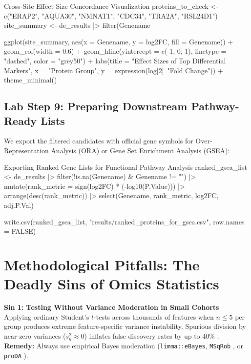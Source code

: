 \documentclass[11pt,twoside,openright]{book}
\begin{document}
\begin{rchunk}{Cross-Site Effect Size Concordance Visualization}
proteins_to_check <- c("ERAP2", "AQUA30", "NMNAT1", "CDC34", "TRA2A", "RSL24D1")
site_summary <- de_results |> 
  filter(Genename %

ggplot(site_summary, aes(x = Genename, y = log2FC, fill = Genename)) +
  geom_col(width = 0.6) +
  geom_hline(yintercept = c(-1, 0, 1), linetype = "dashed", color = "grey50") +
  labs(title = "Effect Sizes of Top Differential Markers",
       x = "Protein Group", y = expression(log[2]~"Fold Change")) +
  theme_minimal()
\end{rchunk}

\subsection{Lab Step 9: Preparing Downstream Pathway-Ready Lists}

We export the filtered candidates with official gene symbols for Over-Representation Analysis (ORA) or Gene Set Enrichment Analysis (GSEA):

\begin{rchunk}{Exporting Ranked Gene Lists for Functional Pathway Analysis}
ranked_gsea_list <- de_results |>
  filter(!is.na(Genename) & Genename != "") |>
  mutate(rank_metric = sign(log2FC) * (-log10(P.Value))) |>
  arrange(desc(rank_metric)) |>
  select(Genename, rank_metric, log2FC, adj.P.Val)

write.csv(ranked_gsea_list, "results/ranked_proteins_for_gsea.csv", row.names = FALSE)
\end{rchunk}

\section{Methodological Pitfalls: The Deadly Sins of Omics Statistics}

\begin{pitfallbox}
\textbf{Sin 1: Testing Without Variance Moderation in Small Cohorts}\\
Applying ordinary Student's $t$-tests across thousands of features when $n \le 5$ per group produces extreme feature-specific variance instability. Spurious division by near-zero variances ($s_g^2 \approx 0$) inflates false discovery rates by up to $40\%$ \cite{smyth2004linear}. \textbf{Remedy:} Always use empirical Bayes moderation (\texttt{limma::eBayes}, \texttt{MSqRob} \cite{goeminne2016msqrob2}, or \texttt{proDA} \cite{ahlmann2020proda}).
\end{pitfallbox}
\end{document}
